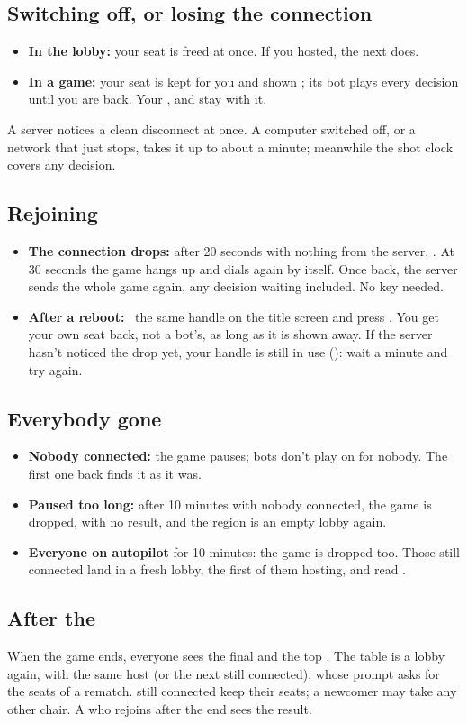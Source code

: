 \subsection{Switching off, or losing the connection}
\begin{itemize}
  \item \textbf{In the lobby:} your seat is freed at once. If you hosted, the next  does.
  \item \textbf{In a game:} your seat is kept for you and shown ; its bot plays every decision until you
    are back. Your ,  and  stay with it.
\end{itemize}
A server notices a clean disconnect at once. A computer switched off, or a network that just stops, takes it up to
about a minute; meanwhile the shot clock covers any decision.

\subsection{Rejoining}
\begin{itemize}
  \item \textbf{The connection drops:} after 20 seconds with nothing from the server, \SignalLost. At 30 seconds the game hangs up and dials again by itself. Once back, the
    server sends the whole game again, any decision waiting included. No key needed.
  \item \textbf{After a reboot:} \typeword\ the same handle on the title screen and press \key{\KeyReturn}. You get your
    own seat back, not a bot's, as long as it is shown away. If the server hasn't noticed the drop yet, your
    handle is still in use (): wait a minute and try again.
\end{itemize}

\subsection{Everybody gone}
\begin{itemize}
  \item \textbf{Nobody connected:} the game pauses; bots don't play on for nobody. The first one back finds it as
    it was.
  \item \textbf{Paused too long:} after 10 minutes with nobody connected, the game is dropped, with no result,
    and the region is an empty lobby again.
  \item \textbf{Everyone on autopilot} for 10 minutes: the game is dropped too. Those still connected land in a
    fresh lobby, the first of them hosting, and read .
\end{itemize}

\subsection{After the }
When the game ends, everyone sees the final  and the top . The table is a lobby again,
with the same host (or the next  still connected), whose prompt asks for the seats of a rematch.
 still connected keep their seats; a newcomer may take any other chair. A  who rejoins
after the end sees the result.
